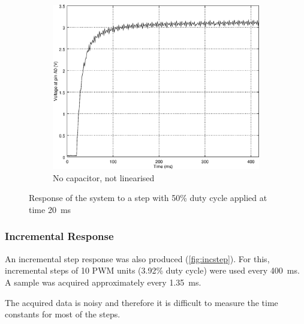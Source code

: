 \begin{figure}[h]
    \begin{subfigure}[t]{0.49\textwidth}
	\centering
	\includegraphics[width=.95\textwidth]{img/step_response_no_capacitor}
	\caption{No capacitor, not linearised}
	\label{fig:step_response_no_capacitor}
    \end{subfigure}
    \caption{Response of the system to a step with 50\% duty cycle applied at time \SI{20}{\milli\second}}
\end{figure}

\subsubsection{Incremental Response}
\label{sub:IncrementalResponse}

An incremental step response was also produced (\autoref{fig:incstep}). For this, incremental steps of 10 PWM units (3.92\% duty cycle) were used every \SI{400}{\milli\second}. A sample was acquired approximately every \SI{1.35}{\milli\second}.

The acquired data is noisy and therefore it is difficult to measure the time constants for most of the steps.

